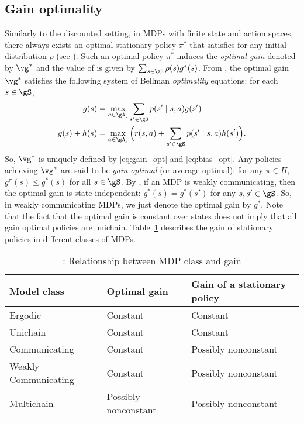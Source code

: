 \subsection{Gain optimality}
\label{ch:mdp:ssec:gain}

Similarly to the discounted setting, in MDPs with finite state and action spaces, there always exists an optimal stationary policy $\pi^*$ that satisfies  for any initial distribution $\rho$ (see \cite[Theorem~9.1.8]{puterman2014markov}).
Such an optimal policy $\pi^*$ induces the \emph{optimal gain} denoted by $\vg^*$ and the value of  is given by $\sum_{s\in\gS} \rho(s)g^*(s)$.
From \cite[Chapter~9]{puterman2014markov}, the optimal gain $\vg^*$ satisfies the following system of Bellman \emph{optimality} equations: for each $s\in\gS$,
\begin{align}
    g(s) &= \max_{a\in\gA_s} \sum_{s'\in\gS}p(s'\mid s,a)g(s') \label{eq:gain_opt} \\
    g(s) +h(s) &= \max_{a\in\gA_s}\Big(r(s,a) +\sum_{s'\in\gS}p(s'\mid s,a)h(s')\Big) \label{eq:bias_opt}.
\end{align}
So, $\vg^*$ is uniquely defined by \eqref{eq:gain_opt} and \eqref{eq:bias_opt}.
Any policies achieving $\vg^*$ are said to be \emph{gain optimal} (or average optimal): for any $\pi\in\Pi$, $g^\pi(s)\le g^*(s)$ for all $s\in\gS$.
By \cite[Theorem~8.3.2]{puterman2014markov}, if an MDP is weakly communicating, then the optimal gain is state independent: $g^*(s)=g^*(s')$ for any $s,s'\in\gS$.
So, in weakly communicating MDPs, we just denote the optimal gain by $g^*$.
Note that the fact that the optimal gain is constant over states does not imply that all gain optimal policies are unichain.
Table~\ref{tab:mdp_vs_gain} describes the gain of stationary policies in different classes of MDPs.
\begin{table}[ht]
    \begin{tabular}{lll}
        \hline
        Model class          & Optimal gain         & Gain of a stationary policy \\ \hline
        Ergodic              & Constant             & Constant                    \\
        Unichain             & Constant             & Constant                    \\
        Communicating        & Constant             & Possibly nonconstant        \\
        Weakly Communicating & Constant             & Possibly nonconstant        \\
        Multichain           & Possibly nonconstant & Possibly nonconstant       \\ \hline
    \end{tabular}
    \caption{\cite[Table~8.3.1]{puterman2014markov}: Relationship between MDP class and gain}
    \label{tab:mdp_vs_gain}
\end{table}
